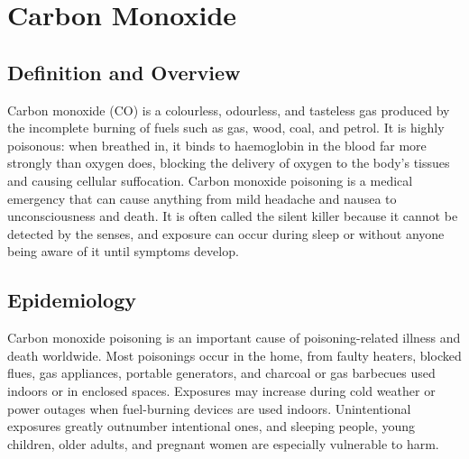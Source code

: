\chapter{Carbon Monoxide}

\section*{Definition and Overview}
Carbon monoxide (CO) is a colourless, odourless, and tasteless gas produced by the incomplete burning of fuels such as gas, wood, coal, and petrol. It is highly poisonous: when breathed in, it binds to haemoglobin in the blood far more strongly than oxygen does, blocking the delivery of oxygen to the body's tissues and causing cellular suffocation. Carbon monoxide poisoning is a medical emergency that can cause anything from mild headache and nausea to unconsciousness and death. It is often called the silent killer because it cannot be detected by the senses, and exposure can occur during sleep or without anyone being aware of it until symptoms develop.

\section*{Epidemiology}
Carbon monoxide poisoning is an important cause of poisoning-related illness and death worldwide. Most poisonings occur in the home, from faulty heaters, blocked flues, gas appliances, portable generators, and charcoal or gas barbecues used indoors or in enclosed spaces. Exposures may increase during cold weather or power outages when fuel-burning devices are used indoors. Unintentional exposures greatly outnumber intentional ones, and sleeping people, young children, older adults, and pregnant women are especially vulnerable to harm.

